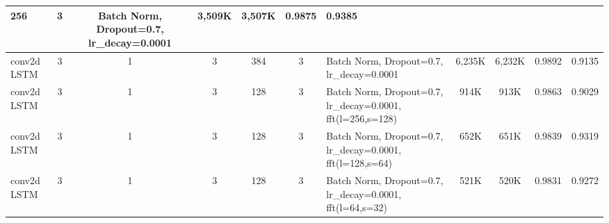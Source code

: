 \documentclass{article}
\begin{document}
\begin{table}
{\begin{tabular} { |m{2.5cm}|c|c|c|c|c|m{3.5cm}|c|c|c|c| }
      256 & 3 & Batch Norm, Dropout=0.7, lr\_decay=0.0001 &
      3,509K & 3,507K & 0.9875 & 0.9385 \\ \hline
      conv2d LSTM & 3 & 1 & 3 &
      384 & 3 & Batch Norm, Dropout=0.7, lr\_decay=0.0001 &
      6,235K & 6,232K & 0.9892 & 0.9135 \\ \hline
      \hline
      conv2d LSTM & 3 & 1 & 3 &
      128 & 3 & Batch Norm, Dropout=0.7, lr\_decay=0.0001,
      fft(l=256,s=128) &
      914K & 913K & 0.9863 & 0.9029 \\ \hline
      conv2d LSTM & 3 & 1 & 3 &
      128 & 3 & Batch Norm, Dropout=0.7, lr\_decay=0.0001,
      fft(l=128,s=64) &
      652K & 651K & 0.9839 & 0.9319 \\ \hline
      conv2d LSTM & 3 & 1 & 3 &
      128 & 3 & Batch Norm, Dropout=0.7, lr\_decay=0.0001,
      fft(l=64,s=32) &
      521K & 520K & 0.9831 & 0.9272 \\ \hline
      
    \end{tabular}
  }
\end{table}
\end{document}
